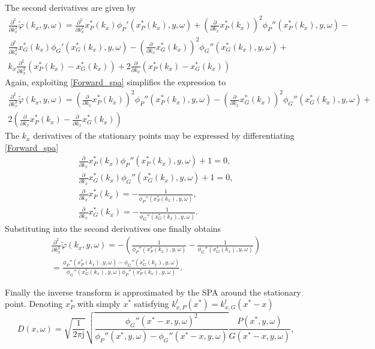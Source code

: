 \documentclass[12pt,a4paper]{article}
\newcommand{\ti}{\mathrm{j}}
\begin{document}
The second derivatives are given by 
\begin{multline}
\frac{\partial^2}{\partial k_x^2}\tilde{\varphi}(k_x,y,\omega) =
\frac{\partial^2}{\partial k_x^2}x_P^*(k_x) \phi_P'(x_P^*(k_x),y,\omega)+
\left( \frac{\partial}{\partial k_x}x_P^*(k_x) \right)^2 \phi_P''(x_P^*(k_x),y,\omega) 
 - 	\\
\frac{\partial^2}{\partial k_x^2}x_G^*(k_x) \phi_G'(x_G^*(k_x),y,\omega)-
\left( \frac{\partial}{\partial k_x}x_G^*(k_x) \right)^2 \phi_G''(x_G^*(k_x),y,\omega) +\\
k_x \frac{\partial^2}{\partial k_x^2}\left( x_P^*(k_x) - x_G^*(k_x) \right)+
2 \frac{\partial}{\partial k_x}\left( x_P^*(k_x) - x_G^*(k_x) \right) 
\end{multline}
Again, exploiting \eqref{Forward_spa} simplifies the expression to
\begin{multline}
\frac{\partial^2}{\partial k_x^2}\tilde{\varphi}(k_x,y,\omega) =
\left( \frac{\partial}{\partial k_x}x_P^*(k_x) \right)^2 \phi_P''(x_P^*(k_x),y,\omega) 
 - 
\left( \frac{\partial}{\partial k_x}x_G^*(k_x) \right)^2 \phi_G''(x_G^*(k_x),y,\omega) +\\
2\left(  \frac{\partial}{\partial k_x} x_P^*(k_x) -  \frac{\partial}{\partial k_x} x_G^*(k_x) \right) 
\end{multline}
The $k_x$ derivatives of the stationary points may be  expressed by differentiating \eqref{Forward_spa}
\begin{eqnarray}
\frac{\partial}{\partial k_x} x_P^*(k_x)\phi_P''(x_P^*(k_x),y,\omega) + 1 = 0,\\
\frac{\partial}{\partial k_x} x_G^*(k_x)\phi_G''(x_G^*(k_x),y,\omega) + 1 = 0,\\
\frac{\partial}{\partial k_x} x_P^*(k_x) = -\frac{1}{\phi_P''(x_P^*(k_x),y,\omega)},\\
\frac{\partial}{\partial k_x} x_G^*(k_x) = -\frac{1}{\phi_G''(x_G^*(k_x),y,\omega)}.
\end{eqnarray}
Substituting into the second derivatives one finally obtains
\begin{multline}
\frac{\partial^2}{\partial k_x^2}\tilde{\varphi}(k_x,y,\omega) =
 - \left( \frac{1}{\phi_P''(x_P^*(k_x),y,\omega)} - \frac{1}{\phi_G''(x_G^*(k_x),y,\omega)} \right) 
\\ =
 \frac{\phi_P''(x_P^*(k_x),y,\omega) - \phi_G''(x_G^*(k_x),y,\omega)}{\phi_G''(x_G^*(k_x),y,\omega) \phi_P''(x_P^*(k_x),y,\omega)}.
\end{multline}

Finally the inverse transform is approximated by the SPA around the stationary point. Denoting $x_P^*$ with simply $x^*$ satisfying $k_{x,P}^l(x^*) = k_{x,G}^l(x^*-x)$
\begin{equation}
D(x,\omega) = 
\sqrt{\frac{1}{2\pi \ti}}
\sqrt{\frac{\phi_G''(x^*- x,y,\omega)^2}{\phi_P''(x^*,y,\omega) - \phi_G''(x^*- x,y,\omega)}}
\frac{ P(x^*,y,\omega) }{G(x^*- x,y,\omega) },
\end{equation}
\end{document}
